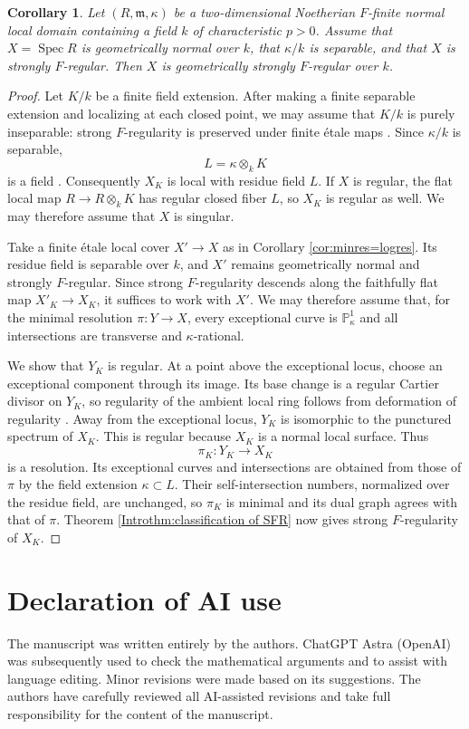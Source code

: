 \documentclass[12pt]{amsart}
\def\Spec{\operatorname{Spec}}
\def\m{{\mathfrak m}}
\newcommand{\PP}{\mathbb{P}}
\newcommand{\stacksproj}[1]{{\cite[\href{https://stacks.math.columbia.edu/tag/#1}{Tag~{#1}}]{stacks-project}}}
\theoremstyle{plain}
\newtheorem{cor}[thm]{Corollary}
\theoremstyle{definition}
\theoremstyle{remark}
\newtheorem{defn and notation}[thm]{Definition and Notation}
\theoremstyle{plain}
\numberwithin{equation}{thm}
\begin{document}
\begin{cor}
Let $(R,\m,\kappa)$ be a two-dimensional Noetherian $F$-finite normal local domain containing a field $k$ of characteristic $p>0$.
Assume that $X=\Spec R$ is geometrically normal over $k$, that $\kappa/k$ is separable, and that $X$ is strongly $F$-regular.
Then $X$ is geometrically strongly $F$-regular over $k$.
\end{cor}
\begin{proof}
Let $K/k$ be a finite field extension.
After making a finite separable extension and localizing at each closed point, we may assume that $K/k$ is purely inseparable: strong $F$-regularity is preserved under finite \'etale maps \cite[Theorem 4.8]{Hara-Watanabe}.
Since $\kappa/k$ is separable,
\[
L=\kappa\otimes_kK
\]
is a field \cite[Theorem 26.4]{Matsumura}.
Consequently $X_K$ is local with residue field $L$.
If $X$ is regular, the flat local map $R\to R\otimes_kK$ has regular closed fiber $L$, so $X_K$ is regular as well.
We may therefore assume that $X$ is singular.

Take a finite \'etale local cover $X'\to X$ as in Corollary \ref{cor:minres=logres}.
Its residue field is separable over $k$, and $X'$ remains geometrically normal and strongly $F$-regular.
Since strong $F$-regularity descends along the faithfully flat map $X'_K\to X_K$, it suffices to work with $X'$.
We may therefore assume that, for the minimal resolution $\pi\colon Y\to X$, every exceptional curve is $\PP^1_\kappa$ and all intersections are transverse and $\kappa$-rational.

We show that $Y_K$ is regular.
At a point above the exceptional locus, choose an exceptional component through its image.
Its base change is a regular Cartier divisor on $Y_K$, so regularity of the ambient local ring follows from deformation of regularity \stacksproj{00NU}.
Away from the exceptional locus, $Y_K$ is isomorphic to the punctured spectrum of $X_K$.
This is regular because $X_K$ is a normal local surface.
Thus
\[
\pi_K\colon Y_K\longrightarrow X_K
\]
is a resolution.
Its exceptional curves and intersections are obtained from those of $\pi$ by the field extension $\kappa\subset L$.
Their self-intersection numbers, normalized over the residue field, are unchanged, so $\pi_K$ is minimal and its dual graph agrees with that of $\pi$.
Theorem \ref{Introthm:classification of SFR} now gives strong $F$-regularity of $X_K$.
\end{proof}



\section*{Declaration of AI use}
The manuscript was written entirely by the authors. ChatGPT Astra (OpenAI) was subsequently used to check the mathematical arguments and to assist with language editing. Minor revisions were made based on its suggestions. The authors have carefully reviewed all AI-assisted revisions and take full responsibility for the content of the manuscript.
\end{document}
